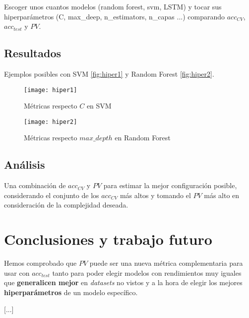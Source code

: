 Escoger unos cuantos modelos (random forest, svm, LSTM) y tocar sus hiperparámetros (C, max\_deep, n\_estimators, n\_capas ...) comparando $acc_{CV}$, $acc_{test}$ y $PV$.

\subsection{Resultados}

Ejemplos posibles con SVM \autoref{fig:hiper1} y Random Forest \autoref{fig:hiper2}.

\begin{figure}[htbp]
  \centering
  \texttt{[image: hiper1]}
  \caption{Métricas respecto $C$ en SVM}
  \label{fig:hiper1}
\end{figure}

\begin{figure}[htbp]
  \centering
  \texttt{[image: hiper2]}
  \caption{Métricas respecto $max\_depth$ en Random Forest}
  \label{fig:hiper2}
\end{figure}

\subsection{Análisis}

Una combinación de $acc_{CV}$ y $PV$ para estimar la mejor configuración posible, considerando el conjunto de los $acc_{CV}$ más altos y tomando el $PV$ más alto en consideración de la complejidad deseada.

\section{Conclusiones y trabajo futuro}

Hemos comprobado que $PV$ puede ser una nueva métrica complementaria para usar con $acc_{test}$ tanto para poder elegir modelos con rendimientos muy iguales que \textbf{generalicen mejor} en \emph{datasets} no vistos y a la hora de elegir los mejores \textbf{hiperparámetros} de un modelo específico.

[...]

\endinput
